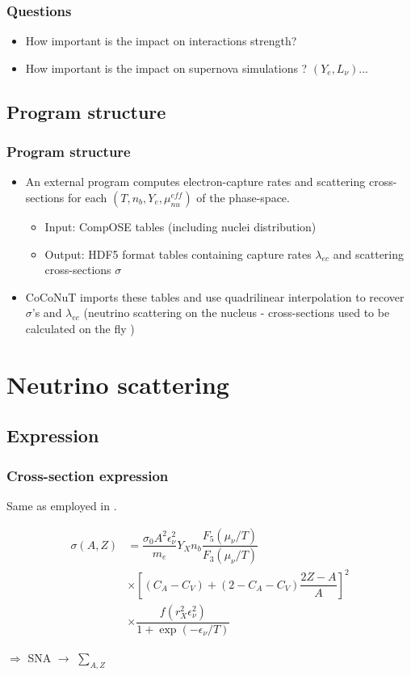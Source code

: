 \documentclass{beamer}
\begin{document}
\begin{frame}
\frametitle{Questions}
\begin{itemize}
\item How important is the impact on interactions strength?
\item How important is the impact on supernova simulations ? $(Y_e, L_\nu)$...
\end{itemize}
\end{frame}

\subsection{Program structure}

\begin{frame}
\frametitle{Program structure}

\begin{itemize}
\item An external program computes electron-capture rates and scattering cross-sections for each $(T, n_b, Y_e, \mu_{nu}^{eff})$ of the phase-space.
\begin{itemize}
\item Input: CompOSE tables (including nuclei distribution)
\item Output: HDF5 format tables containing capture rates $\lambda_{ec}$ and scattering cross-sections $\sigma$
\end{itemize}
\item CoCoNuT imports these tables and use quadrilinear interpolation to recover $\sigma$'s and $\lambda_{ec}$ (\small neutrino scattering on the nucleus -  cross-sections used to be calculated on the fly \normalsize )
\end{itemize}
\end{frame}

\section{Neutrino scattering}

\subsection{Expression}

\begin{frame}
\frametitle{Cross-section expression}

Same as employed in \cite{these_peres}.

\begin{align}
\sigma(A,Z)& = \dfrac{\sigma_0  A^2  \epsilon_\nu^2}{m_e} Y_{X}n_b \dfrac{F_5(\mu_\nu/T)}{F_3(\mu_\nu/T)} \\
& \times \left [ (C_A-C_V)+(2-C_A-C_V)\dfrac{2Z-A}{A} \right ]^2\\
& \times  \dfrac{ f( r_X^2 \epsilon_\nu^2 )}{1+\exp(-\epsilon_\nu/T)}
\end{align}

$\Longrightarrow$ SNA $\to$ $\sum_{A,Z}$

\end{frame}
\end{document}
